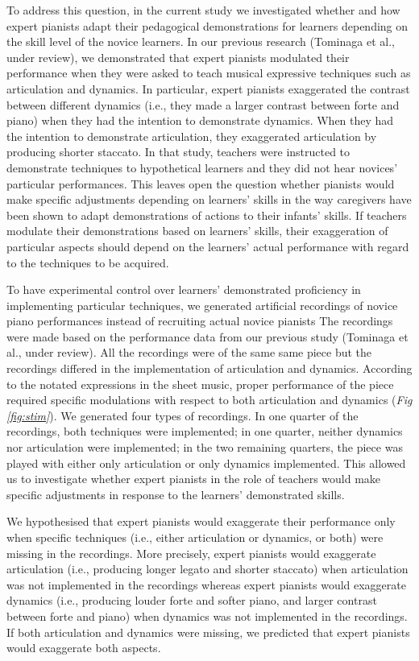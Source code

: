 \documentclass[
  man,floatsintext]{apa6}
\begin{document}
To address this question, in the current study we investigated whether and how expert pianists adapt their pedagogical demonstrations for learners depending on the skill level of the novice learners. In our previous research (Tominaga et al., under review), we demonstrated that expert pianists modulated their performance when they were asked to teach musical expressive techniques such as articulation and dynamics. In particular, expert pianists exaggerated the contrast between different dynamics (i.e., they made a larger contrast between forte and piano) when they had the intention to demonstrate dynamics. When they had the intention to demonstrate articulation, they exaggerated articulation by producing shorter staccato. In that study, teachers were instructed to demonstrate techniques to hypothetical learners and they did not hear novices' particular performances. This leaves open the question whether pianists would make specific adjustments depending on learners' skills in the way caregivers have been shown to adapt demonstrations of actions to their infants' skills. If teachers modulate their demonstrations based on learners' skills, their exaggeration of particular aspects should depend on the learners' actual performance with regard to the techniques to be acquired.

To have experimental control over learners' demonstrated proficiency in implementing particular techniques, we generated artificial recordings of novice piano performances instead of recruiting actual novice pianists The recordings were made based on the performance data from our previous study (Tominaga et al., under review). All the recordings were of the same same piece but the recordings differed in the implementation of articulation and dynamics. According to the notated expressions in the sheet music, proper performance of the piece required specific modulations with respect to both articulation and dynamics (\emph{Fig \ref{fig:stim}}). We generated four types of recordings. In one quarter of the recordings, both techniques were implemented; in one quarter, neither dynamics nor articulation were implemented; in the two remaining quarters, the piece was played with either only articulation or only dynamics implemented. This allowed us to investigate whether expert pianists in the role of teachers would make specific adjustments in response to the learners' demonstrated skills.

We hypothesised that expert pianists would exaggerate their performance only when specific techniques (i.e., either articulation or dynamics, or both) were missing in the recordings. More precisely, expert pianists would exaggerate articulation (i.e., producing longer legato and shorter staccato) when articulation was not implemented in the recordings whereas expert pianists would exaggerate dynamics (i.e., producing louder forte and softer piano, and larger contrast between forte and piano) when dynamics was not implemented in the recordings. If both articulation and dynamics were missing, we predicted that expert pianists would exaggerate both aspects.
\end{document}
